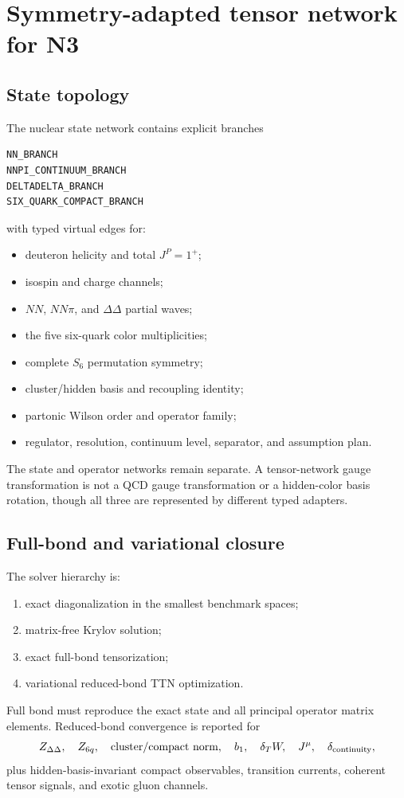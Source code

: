 \documentclass[11pt]{article}
\begin{document}
\section{Symmetry-adapted tensor network for N3}
\label{sec:ttn}

\subsection{State topology}

The nuclear state network contains explicit branches
\begin{verbatim}
NN_BRANCH
NNPI_CONTINUUM_BRANCH
DELTADELTA_BRANCH
SIX_QUARK_COMPACT_BRANCH
\end{verbatim}
with typed virtual edges for:
\begin{itemize}
\item deuteron helicity and total \(J^P=1^+\);
\item isospin and charge channels;
\item \(NN\), \(NN\pi\), and \(\Delta\Delta\) partial waves;
\item the five six-quark color multiplicities;
\item complete \(S_6\) permutation symmetry;
\item cluster/hidden basis and recoupling identity;
\item partonic Wilson order and operator family;
\item regulator, resolution, continuum level, separator, and assumption plan.
\end{itemize}
The state and operator networks remain separate.  A tensor-network gauge transformation is not a QCD gauge transformation or a hidden-color basis rotation, though all three are represented by different typed adapters.

\subsection{Full-bond and variational closure}

The solver hierarchy is:
\begin{enumerate}
\item exact diagonalization in the smallest benchmark spaces;
\item matrix-free Krylov solution;
\item exact full-bond tensorization;
\item variational reduced-bond TTN optimization.
\end{enumerate}
Full bond must reproduce the exact state and all principal operator matrix elements.  Reduced-bond convergence is reported for
\begin{equation}
 Z_{\Delta\Delta},\quad
 Z_{6q},\quad
 \text{cluster/compact norm},\quad
 b_1,\quad
 \delta_TW,\quad
 J^\mu,\quad
 \delta_{\rm continuity},
\label{eq:n3-ttn-observables}
\end{equation}
plus hidden-basis-invariant compact observables, transition currents, coherent tensor signals, and exotic gluon channels.
\end{document}
